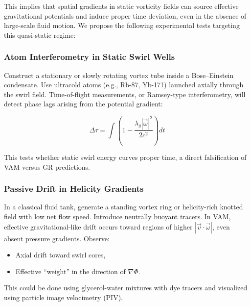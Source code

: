 \documentclass[12pt]{article}
\begin{document}
            This implies that spatial gradients in static vorticity fields can source effective gravitational potentials and induce proper time deviation, even in the absence of large-scale fluid motion. We propose the following experimental tests targeting this quasi-static regime:
        
            \subsubsection{Atom Interferometry in Static Swirl Wells}
        
            Construct a stationary or slowly rotating vortex tube inside a Bose–Einstein condensate. Use ultracold atoms (e.g., Rb-87, Yb-171) launched axially through the swirl field. Time-of-flight measurements, or Ramsey-type interferometry, will detect phase lags arising from the potential gradient:
        
            \begin{equation}
                \Delta \tau = \int \left(1 - \frac{\lambda_g |\vec{\omega}|^2}{2 c^2} \right) dt
            \end{equation}
        
            This tests whether static swirl energy curves proper time, a direct falsification of VAM versus GR predictions.
        
            \subsubsection{Passive Drift in Helicity Gradients}
        
            In a classical fluid tank, generate a standing vortex ring or helicity-rich knotted field with low net flow speed. Introduce neutrally buoyant tracers. In VAM, effective gravitational-like drift occurs toward regions of higher \( |\vec{v} \cdot \vec{\omega}| \), even absent pressure gradients. Observe:
        
            \begin{itemize}
                \item Axial drift toward swirl cores,
                \item Effective “weight” in the direction of \( \nabla \Phi \).
            \end{itemize}
        
            This could be done using glycerol-water mixtures with dye tracers and visualized using particle image velocimetry (PIV).
        
\end{document}
